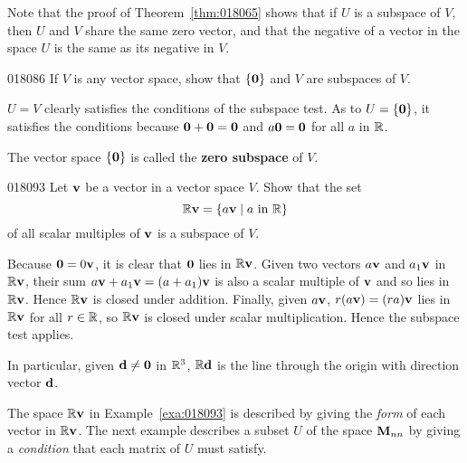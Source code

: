 \noindent Note that the proof of Theorem~\ref{thm:018065} shows that if $U$ is a subspace of $V$, then $U$ and $V$ share the same zero vector, and that the negative of a vector in the space $U$ is the same as its negative in $V$.

\begin{example}{}{018086}
If $V$ is any vector space, show that $\{\textbf{0}\}$ and $V$ are subspaces of $V$.

\begin{solution}
$U = V$ clearly satisfies the conditions of the subspace test. As to $U = \{\textbf{0}\}$, it satisfies the conditions because $\textbf{0} + \textbf{0} = \textbf{0}$ and $a\textbf{0} = \textbf{0}$ for all $a$ in $\mathbb{R}$.
\end{solution}
\end{example}

The vector space $\{\textbf{0}\}$ is called the \textbf{zero subspace} of $V$.

\begin{example}{}{018093}
Let $\textbf{v}$ be a vector in a vector space $V$. Show that the set
\begin{equation*}
\mathbb{R}\textbf{v} = \{a\textbf{v} \mid a \mbox{ in } \mathbb{R} \}
\end{equation*}
of all scalar multiples of $\textbf{v}$ is a subspace of $V$.

\begin{solution}
Because $\textbf{0} = 0\textbf{v}$, it is clear that $\textbf{0}$ lies in $\mathbb{R}\textbf{v}$. Given two vectors $a\textbf{v}$ and $a_{1}\textbf{v}$ in $\mathbb{R}\textbf{v}$, their sum $a\textbf{v} + a_{1}\textbf{v} = (a + a_{1})\textbf{v}$ is also a scalar multiple of $\textbf{v}$ and so lies in $\mathbb{R}\textbf{v}$. Hence $\mathbb{R}\textbf{v}$ is closed under addition. Finally, given $a\textbf{v}$, $r(a\textbf{v}) = (ra)\textbf{v}$ lies in $\mathbb{R}\textbf{v}$ for all $r \in \mathbb{R}$, so $\mathbb{R}\textbf{v}$ is closed under scalar multiplication. Hence the subspace test applies.
\end{solution}
\end{example}

\noindent In particular, given $\textbf{d} \neq \textbf{0}$ in $\mathbb{R}^{3}$, $\mathbb{R}\textbf{d}$ is the line through the origin with direction vector $\textbf{d}$.

The space $\mathbb{R}\textbf{v}$ in Example~\ref{exa:018093} is described by giving the \textit{form} of each vector in $\mathbb{R}\textbf{v}$. The next example describes a subset $U$ of the space $\textbf{M}_{nn}$ by giving a \textit{condition} that each matrix of $U$ must satisfy.

